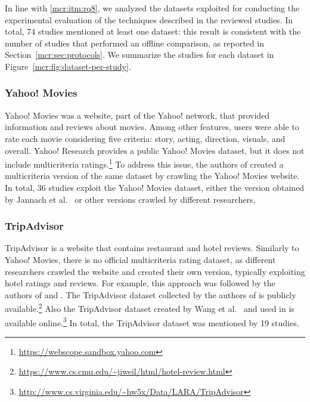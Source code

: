 In line with \ref{mcr:itm:rq8}, we analyzed the datasets exploited for conducting the experimental evaluation of the techniques described in the reviewed studies. In total, 74 studies mentioned at least one dataset: this result is consistent with the number of studies that performed an offline comparison, as reported in Section~\ref{mcr:sec:protocols}. We summarize the studies for each dataset in Figure~\ref{mcr:fig:dataset-per-study}.

\subsubsection{Yahoo! Movies}

Yahoo! Movies was a website, part of the Yahoo! network, that provided information and reviews about movies. Among other features, users were able to rate each movie considering five criteria: story, acting, direction, visuals, and overall. Yahoo! Research provides a public Yahoo! Movies dataset, but it does not include multicriteria ratings.\footnote{\url{https://webscope.sandbox.yahoo.com}} To address this issue, the authors of  created a multicriteria version of the same dataset by crawling the Yahoo! Movies website. In total, 36 studies exploit the Yahoo! Movies dataset, either the version obtained by Jannach et al.~ or other versions crawled by different researchers, 

\subsubsection{TripAdvisor}

TripAdvisor is a website that contains restaurant and hotel reviews. Similarly to Yahoo! Movies, there is no official multicriteria rating dataset, as different researchers crawled the website and created their own version, typically exploiting hotel ratings and reviews. For example, this approach was followed by the authors of  and . The TripAdvisor dataset collected by the authors of  is publicly available.\footnote{\url{https://www.cs.cmu.edu/~jiweil/html/hotel-review.html}} Also the TripAdvisor dataset created by Wang et al.~\cite{Wang2010} and used in  is available online.\footnote{\url{http://www.cs.virginia.edu/~hw5x/Data/LARA/TripAdvisor}} In total, the TripAdvisor dataset was mentioned by 19 studies.

